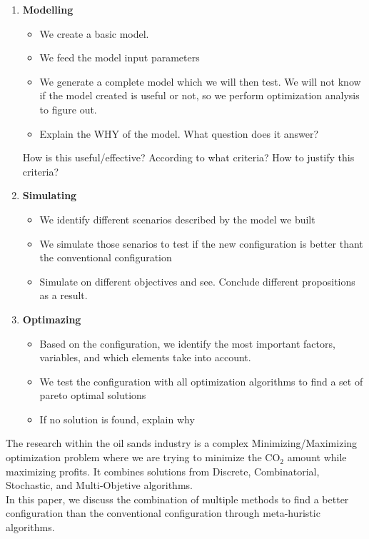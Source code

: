 \documentclass[12pt]{article}
\begin{document}
\begin{enumerate}
\item {\bf Modelling} 

\begin{itemize}
\item We create a basic model.  
\item We feed the model input parameters
\item We generate a complete model which we will then test. We will not know if the model created is useful or not, so we perform optimization analysis to figure out. 
\item Explain the WHY of the model. What question does it answer?
\end{itemize}

How is this useful/effective? According to what criteria? How to justify this criteria? 

\item {\bf Simulating} 

\begin{itemize}
\item We identify different scenarios described by the model we built 
\item We simulate those senarios to test if the new configuration is better thant the conventional configuration
\item Simulate on different objectives and see. Conclude different propositions as a result.
\end{itemize}

\item {\bf Optimazing} 
\begin{itemize}
\item Based on the configuration, we identify the most important factors, variables, and which elements take into account. 
\item We test the configuration with all optimization algorithms to find a set of pareto optimal solutions
\item If no solution is found, explain why
\end{itemize}
\end{enumerate}

The research within the oil sands industry is a complex Minimizing/Maximizing optimization problem where we are trying to minimize the CO$_2$ amount while maximizing profits. It combines solutions from Discrete, Combinatorial, Stochastic, and Multi-Objetive algorithms. \\

In this paper, we discuss the combination of multiple methods to find a better configuration than the conventional configuration through meta-huristic algorithms. \\
\end{document}
